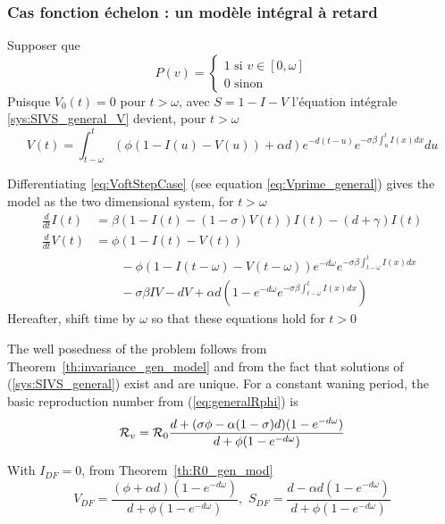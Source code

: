 \documentclass[aspectratio=169]{beamer}\usepackage[]{graphicx}\usepackage[]{xcolor}
\begin{document}
\begin{frame}\frametitle{Cas fonction échelon : un modèle intégral à retard}
Supposer que
\[ 
P(v)=
\left\{
\begin{array}{l}
1\textrm{ si }v\in[0,\omega] \\
0\textrm{ sinon} 
\end{array}
\right.
\]
Puisque $V_0(t)=0$ pour $t>\omega$, avec $S=1-I-V$ l'équation
intégrale \eqref{sys:SIVS_general_V} devient, pour $t>\omega$
\begin{equation}
  V(t)=\int_{t-\omega}^t(\phi (1-I(u)-V(u))+\alpha d)e^{-d(t-u)}
  e^{-\sigma\beta\int_u^tI(x)dx}du
  \label{eq:VoftStepCase}
\end{equation}
\end{frame}

\begin{frame}
Differentiating \eqref{eq:VoftStepCase} (see equation
\eqref{eq:Vprime_general}) gives the model as the two
dimensional system, for $t>\omega$
\begin{subequations}\label{sys:SIVS_DDE}
\begin{align}
  \frac{d}{dt}I(t) &= 
  \beta(1-I(t)-(1-\sigma)V(t))I(t)-(d+\gamma)I(t) \label{sys:SIVS_DDE_dS} \\
  \frac{d}{dt}V(t) &=
  \phi(1-I(t)-V(t)) \label{sys:SIVS_DDE_dV}\\
  &\qquad-\phi(1-I(t-\omega)-V(t-\omega))e^{-d\omega}
  e^{-\sigma\beta\int_{t-\omega}^t I(x)dx} \nonumber \\
  &\qquad -\sigma\beta IV-dV
  +\alpha d\left(1-e^{-d\omega}e^{-\sigma\beta\int_{t-\omega}^t I(x)dx}
  \right) \nonumber
\end{align}
\end{subequations}
Hereafter, shift time by $\omega$ so that these equations hold for $t>0$
\end{frame}


\begin{frame}
The well posedness of the problem follows from
Theorem~\ref{th:invariance_gen_model} and from the fact that solutions
of (\ref{sys:SIVS_general}) exist and are unique.
For a constant waning period, the basic reproduction number from
(\ref{eq:generalRphi}) is
\begin{equation}
 \mathcal{R}_v = \mathcal{R}_0
 \frac{d+(\sigma\phi-\alpha(1-\sigma)d)
 (1-e^{-d\omega})}{d+\phi(1-e^{-d\omega})}
 \label{eq:Rphi}
\end{equation}


With $I_{DF}=0$, from Theorem~\ref{th:R0_gen_mod}
\begin{equation}
 V_{DF}=\frac{(\phi+\alpha d)(1-e^{-d\omega})}{d+\phi(1-e^{-d\omega})}
,\,\,
S_{DF}=\frac{d-\alpha d(1-e^{-d\omega})}{d+\phi(1-e^{-d\omega})}
 \label{eq:DFE_V}
\end{equation}
\end{frame}
\end{document}
